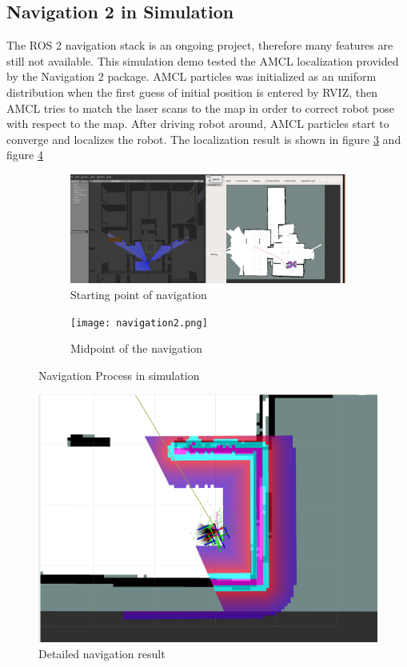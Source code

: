 \documentclass[letterpaper, 10 pt, conference]{ieeeconf}  %
\begin{document}
\subsection{Navigation 2 in Simulation}
The ROS 2 navigation stack is an ongoing project, therefore many features are still not available. This simulation demo tested the AMCL localization provided by the Navigation 2 package. AMCL particles was initialized as an uniform distribution when the first guess of  initial position is entered by RVIZ, then AMCL tries to match the laser scans to the map in order to correct robot pose with respect to the map. After driving robot around, AMCL particles start to converge and localizes the robot. The localization result is shown in figure \ref{fig:navigation_result} and figure \ref{fig:navigation_detail}

\begin{figure}[!pt]
    \begin{subfigure}[b]{0.5\textwidth}
       \includegraphics[width=1\linewidth]{navigation.png}
       \caption{Starting point of navigation}
       \label{fig:Ng1} 
    \end{subfigure}
    \begin{subfigure}[b]{0.5\textwidth}
       \texttt{[image: navigation2.png]}
       \caption{Midpoint of the navigation}
       \label{fig:Ng2}
    \end{subfigure}
  \caption{Navigation Process in simulation} 
  \label{fig:navigation_result}
\end{figure}

\begin{figure}[!pt]
  \includegraphics[width=\linewidth]{navigation_detail.png}
  \caption{Detailed navigation result} 
  \label{fig:navigation_detail}
\end{figure}{}
\end{document}
